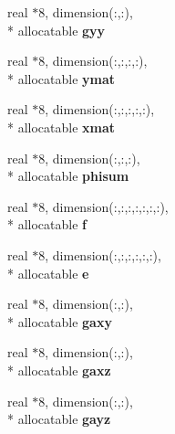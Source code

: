 \begin{DoxyCompactItemize}
\item 
\hypertarget{classsolvar_ac7df8e2a82dab471c01b1c0d712bc1ef}{real $\ast$8, dimension(\-:,\-:), \\*
allocatable {\bfseries gyy}}\label{classsolvar_ac7df8e2a82dab471c01b1c0d712bc1ef}

\item 
\hypertarget{classsolvar_a16fa15c5f7e227b9f8c61a21c77a1a41}{real $\ast$8, dimension(\-:,\-:,\-:,\-:), \\*
allocatable {\bfseries ymat}}\label{classsolvar_a16fa15c5f7e227b9f8c61a21c77a1a41}

\item 
\hypertarget{classsolvar_a400d15edae35ea1f710d2ce77c877d9f}{real $\ast$8, dimension(\-:,\-:,\-:,\-:,\-:), \\*
allocatable {\bfseries xmat}}\label{classsolvar_a400d15edae35ea1f710d2ce77c877d9f}

\item 
\hypertarget{classsolvar_a4fa52ac9570d75a9b4b16dd4e6f05bfb}{real $\ast$8, dimension(\-:,\-:,\-:), \\*
allocatable {\bfseries phisum}}\label{classsolvar_a4fa52ac9570d75a9b4b16dd4e6f05bfb}

\item 
\hypertarget{classsolvar_a62f998c492fd360b6e8da38df9886ea4}{real $\ast$8, dimension(\-:,\-:,\-:,\-:,\-:,\-:,\-:), \\*
allocatable {\bfseries f}}\label{classsolvar_a62f998c492fd360b6e8da38df9886ea4}

\item 
\hypertarget{classsolvar_a14015d8fd97c9e2fad831a5cb056f6d0}{real $\ast$8, dimension(\-:,\-:,\-:,\-:,\-:,\-:), \\*
allocatable {\bfseries e}}\label{classsolvar_a14015d8fd97c9e2fad831a5cb056f6d0}

\item 
\hypertarget{classsolvar_a7997639550cc940fdc84298e057c4325}{real $\ast$8, dimension(\-:,\-:), \\*
allocatable {\bfseries gaxy}}\label{classsolvar_a7997639550cc940fdc84298e057c4325}

\item 
\hypertarget{classsolvar_ab854fafbcf9337a86f37e3df3bcc755a}{real $\ast$8, dimension(\-:,\-:), \\*
allocatable {\bfseries gaxz}}\label{classsolvar_ab854fafbcf9337a86f37e3df3bcc755a}

\item 
\hypertarget{classsolvar_aa4dc92c9b94a2b4d6aecf0eb83c18504}{real $\ast$8, dimension(\-:,\-:), \\*
allocatable {\bfseries gayz}}\label{classsolvar_aa4dc92c9b94a2b4d6aecf0eb83c18504}


\end{DoxyCompactItemize}
